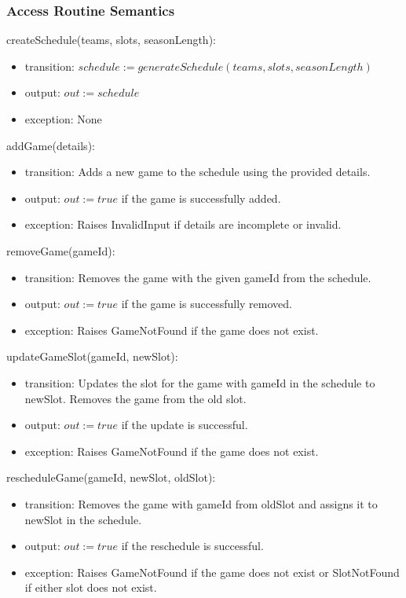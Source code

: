 \documentclass[12pt, titlepage]{article}
\begin{document}
\begin{itemize}
\subsubsection{Access Routine Semantics}

\noindent createSchedule(teams, slots, seasonLength):
\begin{itemize}
    \item transition: $schedule := generateSchedule(teams, slots, seasonLength)$
    \item output: $out := schedule$
    \item exception: None
\end{itemize}

\noindent addGame(details):
\begin{itemize}
    \item transition: Adds a new game to the schedule using the provided details.
    \item output: $out := true$ if the game is successfully added.
    \item exception: Raises InvalidInput if details are incomplete or invalid.
\end{itemize}

\noindent removeGame(gameId):
\begin{itemize}
    \item transition: Removes the game with the given gameId from the schedule.
    \item output: $out := true$ if the game is successfully removed.
    \item exception: Raises GameNotFound if the game does not exist.
\end{itemize}

\noindent updateGameSlot(gameId, newSlot):
\begin{itemize}
    \item transition: Updates the slot for the game with gameId in the schedule to newSlot. Removes the game from the old slot.
    \item output: $out := true$ if the update is successful.
    \item exception: Raises GameNotFound if the game does not exist.
\end{itemize}

\noindent rescheduleGame(gameId, newSlot, oldSlot):
\begin{itemize}
    \item transition: Removes the game with gameId from oldSlot and assigns it to newSlot in the schedule.
    \item output: $out := true$ if the reschedule is successful.
    \item exception: Raises GameNotFound if the game does not exist or SlotNotFound if either slot does not exist.
\end{itemize}


\end{itemize}
\end{document}
